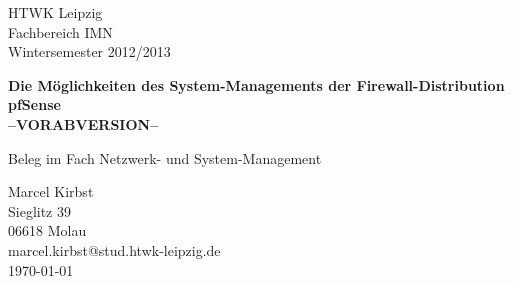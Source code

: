\documentclass[a4paper,12pt]{scrartcl}
\begin{document}

\begin{titlepage}
\thispagestyle{htwkheader}		
HTWK Leipzig\\
Fachbereich IMN \\
Wintersemester 2012/2013




\begin{center}
\begin{Large}
\vfill {\textsf{\textbf{
Die Möglichkeiten des System-Managements der Firewall-Distribution
pfSense\\--VORABVERSION--\\
}}}
\end{Large}
Beleg im Fach Netzwerk- und System-Management
\end{center}

\begin{small}
\vfill
Marcel Kirbst \\
Sieglitz 39 \\
06618 Molau \\
marcel.kirbst@stud.htwk-leipzig.de\\
\today
\end{small}

\end{titlepage}
\addtolength{\voffset}{0cm}
\end{document}
